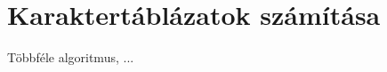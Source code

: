 \section{Karaktertáblázatok számítása}
\label{sec:karakter}
Többféle algoritmus, ...





\clearpage
